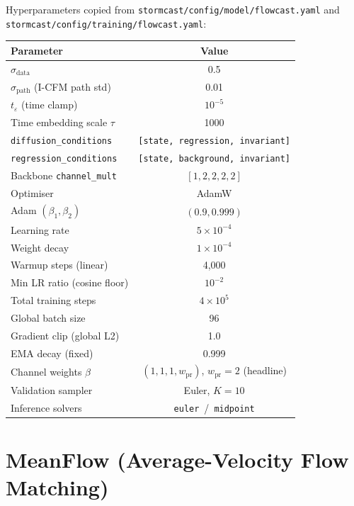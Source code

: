 Hyperparameters copied from \texttt{stormcast/config/model/flowcast.yaml} and \texttt{stormcast/config/training/flowcast.yaml}:
\begin{center}
\begin{tabular}{lc}
\toprule
Parameter & Value \\
\midrule
$\sigma_{\text{data}}$ & 0.5 \\
$\sigma_{\text{path}}$ (I-CFM path std) & 0.01 \\
$t_\varepsilon$ (time clamp) & $10^{-5}$ \\
Time embedding scale $\tau$ & 1000 \\
\texttt{diffusion\_conditions} & \texttt{[state, regression, invariant]} \\
\texttt{regression\_conditions} & \texttt{[state, background, invariant]} \\
Backbone \texttt{channel\_mult} & $[1, 2, 2, 2, 2]$ \\
Optimiser & AdamW \\
Adam $(\beta_1, \beta_2)$ & $(0.9, 0.999)$ \\
Learning rate & $5 \times 10^{-4}$ \\
Weight decay & $1 \times 10^{-4}$ \\
Warmup steps (linear) & 4{,}000 \\
Min LR ratio (cosine floor) & $10^{-2}$ \\
Total training steps & $4 \times 10^{5}$ \\
Global batch size & 96 \\
Gradient clip (global L2) & 1.0 \\
EMA decay (fixed) & 0.999 \\
Channel weights $\beta$ & $(1, 1, 1, w_{\text{pr}})$, $w_{\text{pr}} = 2$ (headline) \\
Validation sampler & Euler, $K=10$ \\
Inference solvers & \texttt{euler} \,/\, \texttt{midpoint} \\
\bottomrule
\end{tabular}
\end{center}

\section{MeanFlow (Average-Velocity Flow Matching)}

